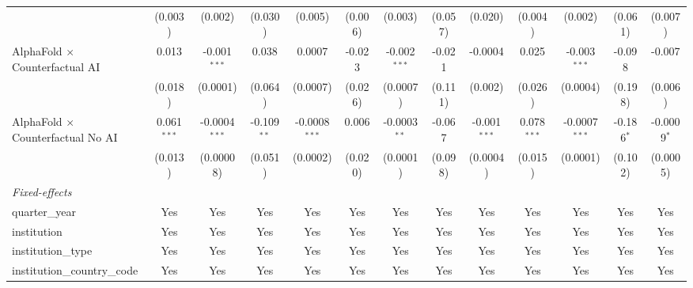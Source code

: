 \begin{tabular}{lcccccccccccc}
                                            & (0.003)       & (0.002)         & (0.030)       & (0.005)         & (0.006)       & (0.003)        & (0.057)       & (0.020)        & (0.004)       & (0.002)         & (0.061)      & (0.007)\\   
   AlphaFold $\times$ Counterfactual AI     & 0.013         & -0.001$^{***}$  & 0.038         & 0.0007          & -0.023        & -0.002$^{***}$ & -0.021        & -0.0004        & 0.025         & -0.003$^{***}$  & -0.098       & -0.007\\   
                                            & (0.018)       & (0.0001)        & (0.064)       & (0.0007)        & (0.026)       & (0.0007)       & (0.111)       & (0.002)        & (0.026)       & (0.0004)        & (0.198)      & (0.006)\\   
   AlphaFold $\times$ Counterfactual No AI  & 0.061$^{***}$ & -0.0004$^{***}$ & -0.109$^{**}$ & -0.0008$^{***}$ & 0.006         & -0.0003$^{**}$ & -0.067        & -0.001$^{***}$ & 0.078$^{***}$ & -0.0007$^{***}$ & -0.186$^{*}$ & -0.0009$^{*}$\\   
                                            & (0.013)       & (0.00008)       & (0.051)       & (0.0002)        & (0.020)       & (0.0001)       & (0.098)       & (0.0004)       & (0.015)       & (0.0001)        & (0.102)      & (0.0005)\\   
   \midrule
   \emph{Fixed-effects}\\
   quarter\_year                            & Yes           & Yes             & Yes           & Yes             & Yes           & Yes            & Yes           & Yes            & Yes           & Yes             & Yes          & Yes\\  
   institution                              & Yes           & Yes             & Yes           & Yes             & Yes           & Yes            & Yes           & Yes            & Yes           & Yes             & Yes          & Yes\\  
   institution\_type                        & Yes           & Yes             & Yes           & Yes             & Yes           & Yes            & Yes           & Yes            & Yes           & Yes             & Yes          & Yes\\  
   institution\_country\_code               & Yes           & Yes             & Yes           & Yes             & Yes           & Yes            & Yes           & Yes            & Yes           & Yes             & Yes          & Yes\\  

\end{tabular}
